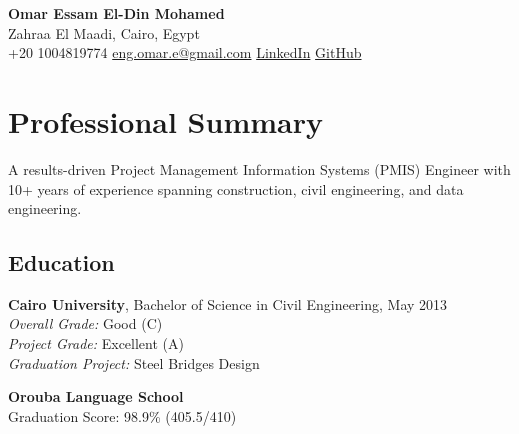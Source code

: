 \documentclass[10pt, letterpaper]{article}
\begin{document}
\begin{mdframed}[style=cvframe]
\begin{center}
    {\LARGE \textbf{Omar Essam El-Din Mohamed}} \\[0.3em]
    {Zahraa El Maadi, Cairo, Egypt} \\[0.2em]
    {\faPhone* \hspace{0.2cm} +20 1004819774} \hspace{0.7cm}
    {\href{mailto:eng.omar.e@gmail.com}{\faEnvelope[regular] \hspace{0.2cm} eng.omar.e@gmail.com}} \hspace{0.7cm}
    {\href{https://www.linkedin.com/in/omar-essam-b602279b}{\faLinkedin \hspace{0.2cm} LinkedIn}} \hspace{0.7cm}
    {\href{https://github.com/omare32}{\faGithub \hspace{0.2cm} GitHub}}
\end{center}

\section{Professional Summary}
A results-driven Project Management Information Systems (PMIS) Engineer with 10+ years of experience spanning construction, civil engineering, and data engineering.

\begin{multicols}{2}
\section{Education}
\textbf{Cairo University}, Bachelor of Science in Civil Engineering, May 2013 \\
\textit{Overall Grade:} Good (C) \\
\textit{Project Grade:} Excellent (A) \\
\textit{Graduation Project:} Steel Bridges Design

\textbf{Orouba Language School} \\
Graduation Score: 98.9\% (405.5/410)


\end{multicols}
\end{mdframed}
\end{document}
